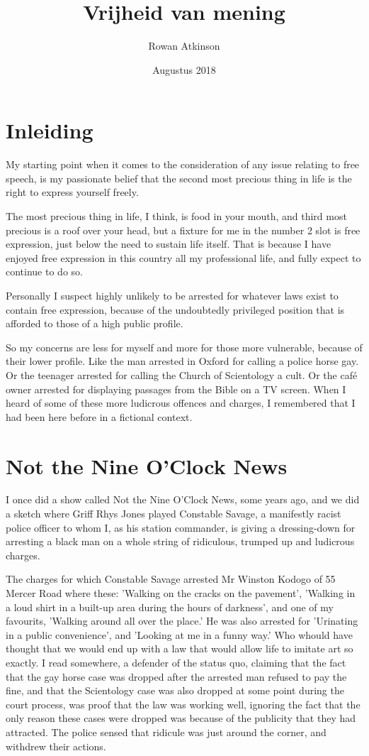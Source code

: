\documentclass[11pt, a4paper]{article}
\title{Vrijheid van mening}
\author{Rowan Atkinson}
\date{Augustus 2018}
\begin{document}
\maketitle

\section{Inleiding}
My starting point when it comes to the consideration of any issue relating to free speech, is my passionate belief that the second most precious thing in life is the right to express yourself freely.

The most precious thing in life, I think, is food in your mouth, and third most precious is a roof over your head, but a fixture for me in the number 2 slot is free expression, just below the need to sustain life itself.
That is because I have enjoyed free expression in this country all my professional life, and fully expect to continue to do so.

Personally I suspect highly unlikely to be arrested for whatever laws exist to contain free expression, because of the undoubtedly privileged position that is afforded to those of a high public profile.

So my concerns are less for myself and more for those more vulnerable, because of their lower profile.
Like the man arrested in Oxford for calling a police horse gay. Or the teenager arrested for calling the Church of Scientology a cult. Or the café owner arrested for displaying passages from the Bible on a TV screen.
When I heard of some of these more ludicrous offences and charges, I remembered that I had been here before in a fictional context.

\section{Not the Nine O'Clock News}
I once did a show called Not the Nine O'Clock News, some years ago, and we did a sketch where Griff Rhys Jones played Constable Savage, a manifestly racist police officer to whom I, as his station commander, is giving a dressing-down for arresting a black man on a whole string of ridiculous, trumped up and ludicrous charges.

The charges for which Constable Savage arrested Mr Winston Kodogo of 55 Mercer Road where these: 'Walking on the cracks on the pavement', 'Walking in a loud shirt in a built-up area during the hours of darkness', and one of my favourits, 'Walking around all over the place.'
He was also arrested for 'Urinating in a public convenience', and 'Looking at me in a funny way.' Who whould have thought that we would end up with a law that would allow life to imitate art so exactly.
I read somewhere, a defender of the status quo, claiming that the fact that the gay horse case was dropped after the arrested man refused to pay the fine, and that the Scientology case was also dropped at some point during the court process, was proof that the law was working well, ignoring the fact that the only reason these cases were dropped was because of the publicity that they had attracted.
The police sensed that ridicule was just around the corner, and withdrew their actions.
\end{document}
